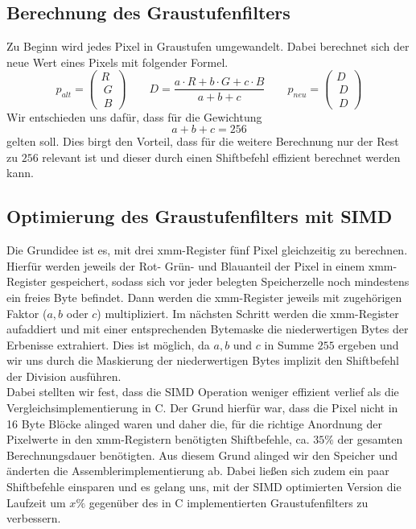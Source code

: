 \documentclass[course=erap]{aspdoc}
\begin{document}
\subsection{Berechnung des Graustufenfilters}
Zu Beginn wird jedes Pixel in Graustufen umgewandelt. Dabei berechnet sich der neue Wert eines Pixels mit folgender Formel.
\begin{equation}
\label{(2)}
p_{alt} =  \begin{pmatrix}R \\\ G \\\ B \end{pmatrix} \qquad D = \frac{a \cdot R  + b \cdot G  + c \cdot B }{a + b + c} \qquad p_{neu} =  \begin{pmatrix}D \\\ D \\\ D \end{pmatrix}
\end{equation}	
Wir entschieden uns dafür, dass für die Gewichtung \begin{equation}
a + b + c = 256
\end{equation} gelten soll. Dies birgt den Vorteil, dass für die weitere Berechnung nur der Rest zu $256$ relevant ist und dieser durch einen Shiftbefehl effizient berechnet werden kann.

\subsection{Optimierung des Graustufenfilters mit SIMD}
Die Grundidee ist es, mit drei xmm-Register fünf Pixel gleichzeitig zu berechnen. Hierfür werden jeweils der Rot- Grün- und Blauanteil der Pixel in einem xmm-Register gespeichert, sodass sich vor jeder belegten Speicherzelle noch mindestens ein freies Byte befindet. Dann werden die xmm-Register jeweils mit zugehörigen Faktor ($a,b$ oder $c$) multipliziert. Im nächsten Schritt werden die xmm-Register aufaddiert und mit einer entsprechenden Bytemaske die niederwertigen Bytes der Erbenisse extrahiert. Dies ist möglich, da $a,b$ und $c$ in Summe $255$ ergeben und wir uns durch die Maskierung der niederwertigen Bytes implizit den Shiftbefehl der Division ausführen.
\\
\newline
\noindent
Dabei stellten wir fest, dass die SIMD Operation weniger effizient verlief als die Vergleichsimplementierung in C. Der Grund hierfür war, dass die Pixel nicht in 16 Byte Blöcke alinged waren und daher die, für die richtige Anordnung der Pixelwerte in den xmm-Registern benötigten Shiftbefehle, ca. $35\%$ der gesamten Berechnungsdauer benötigten. Aus diesem Grund alinged wir den Speicher und änderten die Assemblerimplementierung ab. Dabei ließen sich zudem ein paar Shiftbefehle einsparen und es gelang uns, mit der SIMD optimierten Version die Laufzeit um $x\%$ gegenüber des in C implementierten Graustufenfilters zu verbessern.  
  
\end{document}
